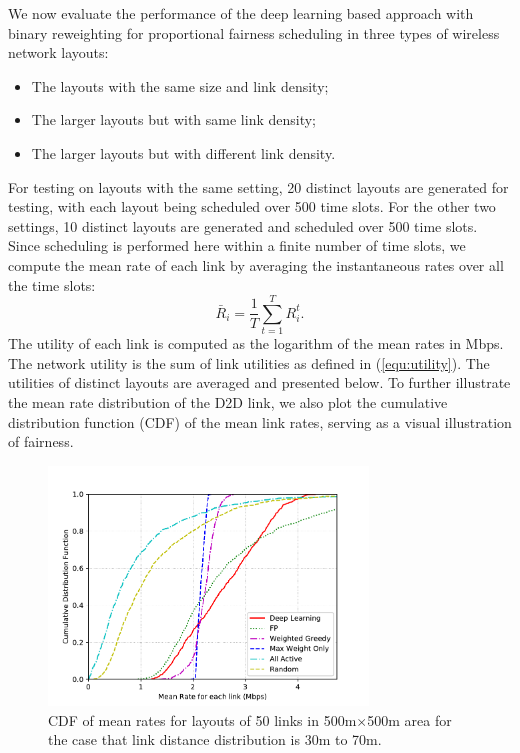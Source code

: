 \documentclass[journal,12pt,onecolumn,draftclsnofoot,]{IEEEtran}
\begin{document}
We now evaluate the performance of the deep learning based approach with binary
reweighting for proportional fairness scheduling in three types of wireless
network layouts: 
\begin{itemize}
\item The layouts with the same size and link density;
\item The larger layouts but with same link density;
\item The larger layouts but with different link density.
\end{itemize}
For testing on layouts with the same setting, 20 distinct layouts are generated for
testing, with each layout being scheduled over 500 time slots.  For the other
two settings, 10 distinct layouts are generated and scheduled over 500 time
slots. Since scheduling is performed here within a finite number of time slots,
we compute the mean rate of each link by averaging the instantaneous
rates over all the time slots:
\begin{equation} \label{equ:simpleMeanRate}
	\bar R_{i} = \frac{1}{T}\sum_{t=1}^T R_i^t.
\end{equation}
The utility of each link is computed as the logarithm of the
mean rates in Mbps. The network utility is the sum of link utilities as defined in
(\ref{equ:utility}). The utilities of distinct layouts are averaged and
presented below.  To further illustrate the mean rate distribution of the D2D
link, we also plot the cumulative distribution function (CDF) of the mean link
rates, serving as a visual illustration of fairness.

\begin{figure}
\centering
\includegraphics[width=8.5cm]{fig/MeanRatesCDF_30_70}
\caption{CDF of mean rates for layouts of 50 links in 500m$\times$500m area for the
case that link distance distribution is 30m to 70m.}
\label{fig:origmeanratescdf}
\end{figure}
\end{document}
